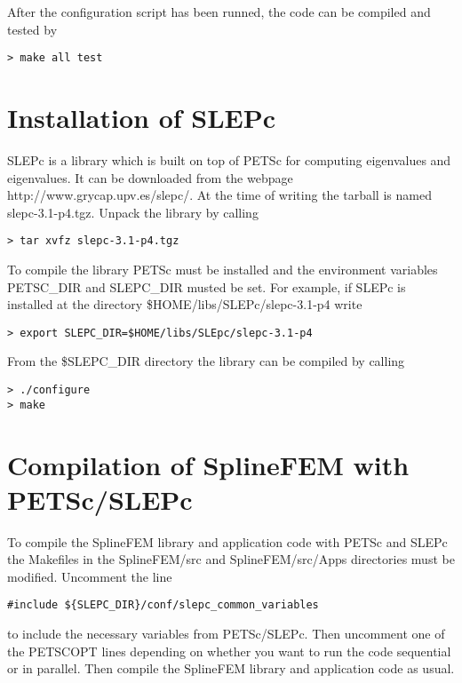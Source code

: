 \documentclass[a4wide,11pt]{article}
\begin{document}
After the configuration script has been runned, the code can be compiled
and tested by
\begin{verbatim}
> make all test
\end{verbatim}

\section{Installation of SLEPc}
SLEPc is a library which is built on top of PETSc for computing eigenvalues 
and eigenvalues. It can be downloaded from the webpage 
\textsf{http://www.grycap.upv.es/slepc/}. At the time of writing the tarball
is named \textsf{slepc-3.1-p4.tgz}. Unpack the library by calling
\begin{verbatim}
> tar xvfz slepc-3.1-p4.tgz
\end{verbatim}
To compile the library PETSc must be installed and the environment variables
\textsf{PETSC\_DIR} and \textsf{SLEPC\_DIR} musted be set. For example,
if SLEPc is installed at the directory \textsf{\$HOME/libs/SLEPc/slepc-3.1-p4}
write
\begin{verbatim}
> export SLEPC_DIR=$HOME/libs/SLEpc/slepc-3.1-p4
\end{verbatim}
From  the \textsf{\$SLEPC\_DIR} directory the library can be compiled
by calling
\begin{verbatim}
> ./configure
> make
\end{verbatim}

\section{Compilation of SplineFEM with PETSc/SLEPc}
To compile the SplineFEM library and application code with
PETSc and SLEPc the Makefiles in the \textsf{SplineFEM/src}
and \textsf{SplineFEM/src/Apps} directories must be modified.
Uncomment the line
\begin{verbatim}
#include ${SLEPC_DIR}/conf/slepc_common_variables
\end{verbatim}
to include the necessary variables from PETSc/SLEPc. Then uncomment
one of the \textsf{PETSCOPT} lines depending on whether you want to
run the code sequential or in parallel. Then compile the SplineFEM
library and application code as usual.
\end{document}
